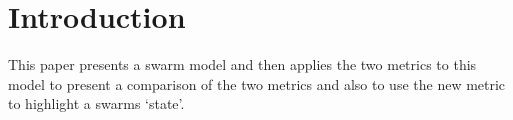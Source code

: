 \documentclass[10pt,journal,letterpaper,twoside]{IEEEtran}
\begin{document}
\IEEEdisplaynotcompsoctitleabstractindextext


%
\IEEEpeerreviewmaketitle


\section{Introduction\label{sec:intro}}

This paper presents a swarm model and then applies the two metrics to this model to present a comparison of the two metrics and also to use the new metric to highlight a swarms `state'.
 
\end{document}
